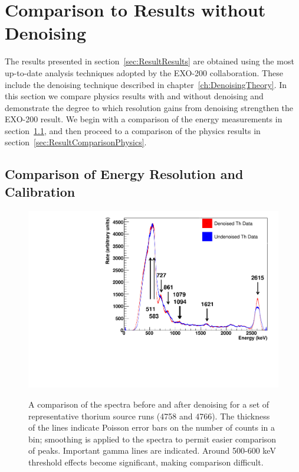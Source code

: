 \section{Comparison to Results without Denoising}\label{sec:ResultComparison}

The results presented in section~\ref{sec:ResultResults} are obtained using the most up-to-date analysis techniques adopted by the EXO-200 collaboration.  These include the denoising technique described in chapter~\ref{ch:DenoisingTheory}.  In this section we compare physics results with and without denoising and demonstrate the degree to which resolution gains from denoising strengthen the EXO-200 result.  We begin with a comparison of the energy measurements in section~\ref{sec:ResultComparisonEnergy}, and then proceed to a comparison of the physics results in section~\ref{sec:ResultComparisonPhysics}.

\subsection{Comparison of Energy Resolution and Calibration}\label{sec:ResultComparisonEnergy}

\begin{figure}
\begin{center}
\includegraphics[keepaspectratio=true,width=\textwidth]{ThSourceSpectrumComparison.pdf}
\end{center}
\renewcommand{\baselinestretch}{1}
\small\normalsize
\begin{quote}
\caption{A comparison of the spectra before and after denoising for a set of representative thorium source runs (4758 and 4766).  The thickness of the lines indicate Poisson error bars on the number of counts in a bin; smoothing is applied to the spectra to permit easier comparison of peaks.  Important gamma lines are indicated.  Around 500-600 keV threshold effects become significant, making comparison difficult.}
\label{fig:ThSourceSpectrumComparison}
\end{quote}
\end{figure}
\renewcommand{\baselinestretch}{2}
\small\normalsize

